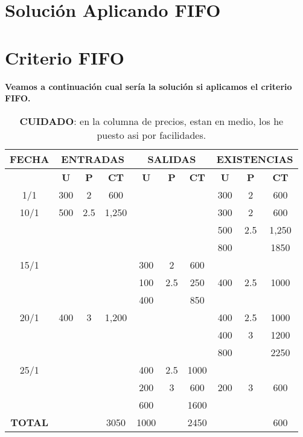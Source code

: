 \documentclass{article}
\begin{document}
\section*{Solución Aplicando FIFO}

\section*{Criterio FIFO}

\textbf{Veamos a continuación cual sería la solución si aplicamos el criterio FIFO.}
\begin{table}[H]
    \centering
    \begin{tabular}{|c|ccc|ccc|ccc|}
    \hline
    \textbf{FECHA} & \multicolumn{3}{c|}{\textbf{ENTRADAS}} & \multicolumn{3}{c|}{\textbf{SALIDAS}} & \multicolumn{3}{c|}{\textbf{EXISTENCIAS}} \\
    \hline
     & \textbf{U} & \textbf{P} & \textbf{CT} & \textbf{U} & \textbf{P} & \textbf{CT} & \textbf{U} & \textbf{P} & \textbf{CT} \\
    \hline
    1/1 & 300 & 2 & 600 &  &  &  & 300 & 2 & 600 \\
    \hline
    10/1 & 500 & 2.5 & 1,250 &  &  &  & 300 & 2 & 600 \\
     &  &  &  &  &  &  & 500 & 2.5 & 1,250 \\
     &  &  &  &  &  &  & 800 &  & 1850 \\
    \hline
    15/1 &  &  &  & 300 & 2 & 600 &  &  &  \\
     &  &  &  & 100 & 2.5 & 250 & 400 & 2.5 & 1000  \\
     &  &  &  & 400 &  & 850 &  &  &  \\
    \hline
    20/1 & 400 & 3 & 1,200 &  &  &  & 400 & 2.5 & 1000 \\
     &  &  &  &  &  &  & 400 & 3 & 1200 \\
     &  &  &  &  &  &  & 800 &  & 2250  \\
    \hline
    25/1 &  &  &  & 400 & 2.5 & 1000 &  &  &  \\
    &  &  &  & 200  & 3 & 600 & 200 & 3 & 600 \\
    &  &  &  & 600 &  & 1600 &  &  &   \\    \hline
    \textbf{TOTAL} &  & & 3050 & 1000 &  & 2450 &  &  & 600 \\
    \hline
    \end{tabular}
    \caption{\textbf{CUIDADO}: en la columna de precios, estan en medio, los he puesto asi por facilidades.}
\end{table}
\end{document}
